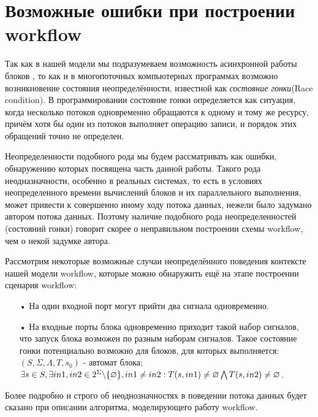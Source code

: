 \documentclass[a4paper,12pt]{article}
\begin{document}
\begin{table}[!hp]
\begin{tabular}{c|c|>{\centering}m{5cm} l}
\end{tabular}
\label{tab:blocks}
\end{table}
\newpage
\section{Возможные ошибки при построении workflow}
Так как в нашей модели мы подразумеваем возможность асинхронной работы блоков , то как и в многопоточных компьютерных программах возможно возникновение состояния неопределённости, известной как \textit{состояние гонки}(Race condition). В программировании состояние гонки определяется как ситуация, когда несколько потоков  одновременно обращаются к одному и тому же ресурсу, причём хотя бы один из потоков выполняет операцию записи, и порядок этих обращений точно не определен.

Неопределенности подобного рода мы будем рассматривать как ошибки, обнаружению которых посвящена часть данной работы. Такого рода неодназначности, особенно в реальных системах,
то есть в условиях неопределенного времени вычислений блоков и их параллельного выполнения, может привести к совершенно иному ходу потока данных, нежели было задумано автором потока данных.
Поэтому наличие подобного рода неопределенностей (состояний гонки) говорит скорее о неправильном построении схемы workflow, чем о некой задумке автора.

Рассмотрим некоторые возможные случаи неопределённого поведения контексте нашей модели workflow, которые можно обнаружить ещё на этапе построении сценария workflow:

\begin{enumerate}
\item[•] На один входной порт могут прийти два сигнала одновременно.
\item[•] На входные порты блока одновременно приходит такой набор сигналов, что запуск блока возможен по разным наборам сигналов.
Такое состояние гонки потенциально возможно для блоков, для которых выполняется:\\
$(S, \Sigma,\Lambda, T, s_{0})$  - автомат блока;\\
$ \exists s \in S , \exists in1, in2 \in 2^{\Sigma}\backslash \lbrace \varnothing \rbrace ,  in1 \neq in2 :\\  T(s, in1) \neq \varnothing   \bigwedge    T(s, in2) \neq \varnothing$.
\end{enumerate}

Более подробно и строго об неоднозначностях в поведении потока данных будет сказано при описании алгоритма, моделирующего работу workflow.
\end{document}
